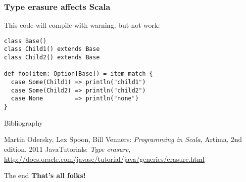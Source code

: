 \documentclass{beamer}
\begin{document}
\begin{frame}[fragile]
\frametitle{Type erasure affects Scala}
This code will compile with warning, but not work:
\begin{lstlisting}
class Base()
class Child1() extends Base
class Child2() extends Base

def foo(item: Option[Base]) = item match {
  case Some(Child1) => println("child1")
  case Some(Child2) => println("child2")
  case None         => println("none")
}
\end{lstlisting}
\end{frame}

\begin{frame}{Bibliography}
\begin{thebibliography}{00}
Martin Odersky, Lex Spoon, Bill Venners:
\emph{Programming in Scala},
Artima, 2nd edition, 2011
Java\texttrademark  Tutorials: \emph{Type erasure}, \url{http://docs.oracle.com/javase/tutorial/java/generics/erasure.html}
\end{thebibliography}
\end{frame}

\begin{frame}{The end}
\centering
\textbf{That's all folks!}
\end{frame}
\end{document}
